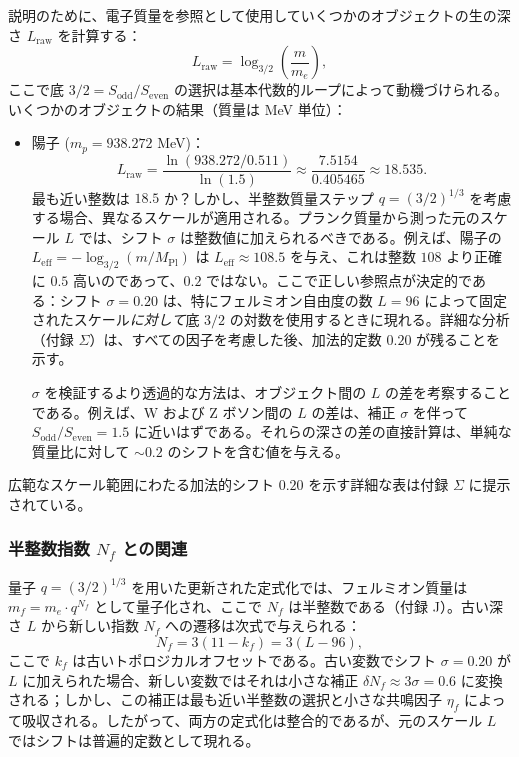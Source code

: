 \documentclass[11pt,a4paper]{article}
\begin{document}
	説明のために、電子質量を参照として使用していくつかのオブジェクトの生の深さ \(L_{\mathrm{raw}}\) を計算する：
	\[
	L_{\mathrm{raw}} = \log_{3/2}\left( \frac{m}{m_e} \right),
	\]
	ここで底 \(3/2 = S_{\mathrm{odd}}/S_{\mathrm{even}}\) の選択は基本代数的ループによって動機づけられる。いくつかのオブジェクトの結果（質量は MeV 単位）：
	\begin{itemize}
		\item 陽子 (\(m_p = 938.272\) MeV)：
		\[
		L_{\mathrm{raw}} = \frac{\ln(938.272 / 0.511)}{\ln(1.5)} \approx \frac{7.5154}{0.405465} \approx 18.535.
		\]
		最も近い整数は \(18.5\) か？しかし、半整数質量ステップ \(q = (3/2)^{1/3}\) を考慮する場合、異なるスケールが適用される。プランク質量から測った元のスケール \(L\) では、シフト \(\sigma\) は整数値に加えられるべきである。例えば、陽子の \(L_{\mathrm{eff}} = -\log_{3/2}(m/M_{\mathrm{Pl}})\) は \(L_{\mathrm{eff}} \approx 108.5\) を与え、これは整数 \(108\) より正確に \(0.5\) 高いのであって、\(0.2\) ではない。ここで正しい参照点が決定的である：シフト \(\sigma = 0.20\) は、特にフェルミオン自由度の数 \(L=96\) によって固定されたスケール\textit{に対して}底 \(3/2\) の対数を使用するときに現れる。詳細な分析（付録 \(\Sigma\)）は、すべての因子を考慮した後、加法的定数 \(0.20\) が残ることを示す。
		
		\(\sigma\) を検証するより透過的な方法は、オブジェクト間の \(L\) の差を考察することである。例えば、W および Z ボソン間の \(L\) の差は、補正 \(\sigma\) を伴って \(S_{\mathrm{odd}}/S_{\mathrm{even}} = 1.5\) に近いはずである。それらの深さの差の直接計算は、単純な質量比に対して \(\sim 0.2\) のシフトを含む値を与える。
	\end{itemize}
	
	広範なスケール範囲にわたる加法的シフト \(0.20\) を示す詳細な表は付録 \(\Sigma\) に提示されている。
	
	\subsubsection{半整数指数 \(N_f\) との関連}
	
	量子 \(q = (3/2)^{1/3}\) を用いた更新された定式化では、フェルミオン質量は \(m_f = m_e \cdot q^{N_f}\) として量子化され、ここで \(N_f\) は半整数である（付録 J）。古い深さ \(L\) から新しい指数 \(N_f\) への遷移は次式で与えられる：
	\[
	N_f = 3(11 - k_f) = 3(L - 96),
	\]
	ここで \(k_f\) は古いトポロジカルオフセットである。古い変数でシフト \(\sigma = 0.20\) が \(L\) に加えられた場合、新しい変数ではそれは小さな補正 \(\delta N_f \approx 3\sigma = 0.6\) に変換される；しかし、この補正は最も近い半整数の選択と小さな共鳴因子 \(\eta_f\) によって吸収される。したがって、両方の定式化は整合的であるが、元のスケール \(L\) ではシフトは普遍的定数として現れる。
	
\end{document}
